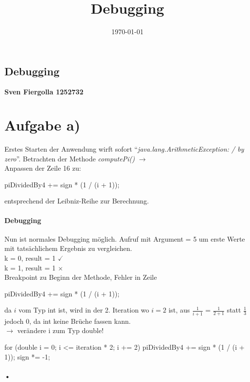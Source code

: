 \documentclass[10pt, a4paper]{article}
\title{Debugging}
\date{\today}
\begin{document}
\begin{center}
\section*{Debugging}
\end{center}
\textbf{Sven Fiergolla 1252732}
\section*{Aufgabe a)}
\paragraph{}
Erstes Starten der Anwendung wirft sofort \enquote{\textit{java.lang.ArithmeticException: / by zero}}. Betrachten der Methode \textit{computePi()} $\rightarrow$\\
Anpassen der Zeile 16 zu: \\
\begin{numVblock}
piDividedBy4 += sign * (1 / (i + 1));
\end{numVblock}
entsprechend der Leibniz-Reihe zur Berechnung.\par
\bigskip

\paragraph{Debugging}
Nun ist normales Debugging möglich. Aufruf mit Argument = 5 um erste Werte mit tatsächlichem Ergebnis zu vergleichen.\\
k = 0, result = 1 $\checked$\\
k = 1, result = 1 $\times$\\
Breakpoint zu Beginn der Methode, Fehler in Zeile\\
\begin{numVblock}
piDividedBy4 += sign * (1 / (i + 1));
\end{numVblock}
da $i$ vom Typ int ist, wird in der 2. Iteration wo $i = 2$ ist, aus $\frac{1}{i + 1}$ = $\frac{1}{2 + 1}$ statt $\frac{1}{3}$ jedoch 0, da int keine Brüche fassen kann.\\
$\rightarrow$ verändere i zum Typ double!\\
\begin{numVblock}
for (double i = 0; i <= iteration * 2; i += 2) {
piDividedBy4 += sign * (1 / (i + 1));
sign *= -1;
}
\end{numVblock}\paragraph{•}
\end{document}
